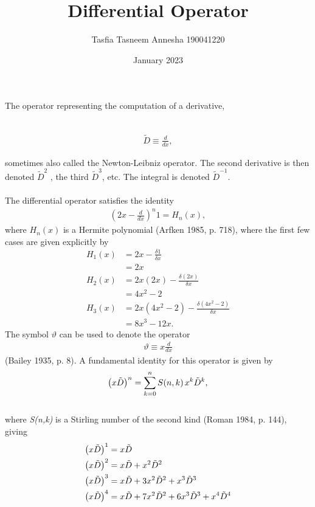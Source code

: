 \documentclass{article}
\title{\textbf{Differential Operator}}
\author{Tasfia Tasneem Annesha 190041220}
\date{January 2023}
\begin{document}
\maketitle
The operator representing the computation of a derivative,

\\
\begin{align}
\tilde{D} \equiv \frac{d}{dx} ,
\end{align}

sometimes also called the Newton-Leibniz operator. The second derivative is then denoted $\tilde{D}^2$ , the third $\tilde{D} ^3$, etc. The integral is denoted $\tilde{D}^{-1}$.
\\
\\
The differential operator satisfies the identity
\begin{align}
     \left(2x- \frac{d}{dx} \right)^n 1= H_n\left(x\right),
\end{align}
where \textit{$H_n(x)$} is a Hermite polynomial (Arfken 1985, p. 718), where the first few cases are given explicitly by
\begin{align}
    H_1(x)&=2x- \frac{\delta 1}{\delta x}\\
          & =2x\\
    H_2(x)&=2x(2x)- \frac{\delta (2x)}{\delta x}\\
          & =4x^2 -2\\
    H_3(x)&=2x(4 x^2 - 2)- \frac{\delta (4x^2 -2)}{\delta x}\\
          & =8x^3 - 12x.      
\end{align}
The symbol $\vartheta$ can be used to denote the operator
\\
\begin{align}
    \vartheta \equiv x \frac{d}{dx}
\end{align}
(Bailey 1935, p. 8). A fundamental identity for this operator is given by\\
\begin{align}
    \left(x\Tilde{D}\right)^n = \sum_{k=0}^{n}S(n,k)\hspace{0.05cm}x^k \Tilde{D}^k ,
\end{align}
\\
where \textit{S(n,k)} is a Stirling number of the second kind (Roman 1984, p. 144), giving
\begin{align}
    \left(x\Tilde{D}\right)^1 &= x\Tilde{D} \\
    \left(x\Tilde{D}\right)^2 &= x\Tilde{D} + x^2\Tilde{D} ^2\\ 
    \left(x\Tilde{D}\right)^3 &= x\Tilde{D} + 3x^2\Tilde{D} ^2 + x^3\Tilde{D} ^3\\ 
    \left(x\Tilde{D}\right)^4 &= x\Tilde{D} + 7x^2\Tilde{D} ^2 + 6x^3\Tilde{D} ^3 + x^4\Tilde{D}^4
\end{align}
\end{document}
